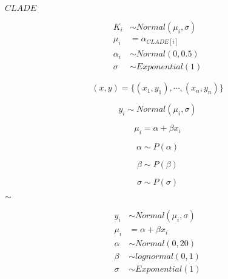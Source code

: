 \documentclass[10pt]{book}
\begin{document}
\begin{mdSnippets}
\begin{mdInlineSnippet}[66b10f47980783871651aca5423926c6]%
{$CLADE$}\end{mdInlineSnippet}%
\begin{mdDisplaySnippet}[15473f0ddf9b57f29c368d1dc24f2a5d]%
\[%
\begin{aligned}
  K_i &\sim Normal(\mu_i, \sigma) \\
  \mu_i &= \alpha_{CLADE[i]} \\
  \alpha_i &\sim Normal(0, 0.5) \\
  \sigma &\sim Exponential(1)
\end{aligned}
\]%
\end{mdDisplaySnippet}%
\begin{mdDisplaySnippet}[0d4b25115559cfcc33416e019a4ee8a2]%
\[%
(x, y) = \{ (x_1, y_1), \cdots, (x_n, y_n) \}
\]%
\end{mdDisplaySnippet}%
\begin{mdDisplaySnippet}[6f2f0b9a673a81e6c09fb1eb1208f95d]%
\[%
y_i \sim Normal(\mu_i, \sigma)
\]%
\end{mdDisplaySnippet}%
\begin{mdDisplaySnippet}[f68bd15a398c14ce233accfd8f2d71b8]%
\[%
\mu_i = \alpha + \beta x_i 
\]%
\end{mdDisplaySnippet}%
\begin{mdDisplaySnippet}[fd69ba101eb0892787358e2eb8ff1fab]%
\[%
\alpha \sim P(\alpha)
\]%
\end{mdDisplaySnippet}%
\begin{mdDisplaySnippet}[5037606fc130e14f3245da2679196d5e]%
\[%
\beta \sim P(\beta)
\]%
\end{mdDisplaySnippet}%
\begin{mdDisplaySnippet}%
\[%
\sigma \sim P(\sigma)
\]%
\end{mdDisplaySnippet}%
\begin{mdInlineSnippet}[6588c95074f2609674f5fe10ab63f88f]%
{$\sim$}\end{mdInlineSnippet}%
\begin{mdDisplaySnippet}[baeb59b81e1d5c4797ef21f0f3738eb7]%
\[%
\begin{aligned} 
  y_i &\sim Normal(\mu_i, \sigma) \\
  \mu_i &= \alpha + \beta x_i  \\
  \alpha &\sim Normal(0, 20) \\
  \beta &\sim lognormal(0, 1) \\
  \sigma &\sim Exponential(1) \\
\end{aligned} 
\]%
\end{mdDisplaySnippet}%

\end{mdSnippets}
\end{document}
